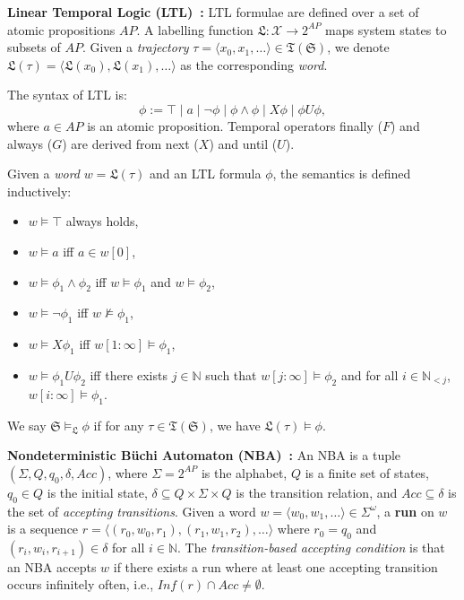 \textbf{Linear Temporal Logic (LTL)~\cite{pnueli1977temporal}:} LTL formulae are defined over a set of atomic propositions $AP$. A labelling function $\mathfrak{L}: \mathcal{X} \rightarrow 2^{AP}$ maps system states to subsets of $AP$. Given a \emph{trajectory} $\tau = \langle x_0, x_1, \dots \rangle \in \mathfrak{T}(\mathfrak{S})$, we denote $\mathfrak{L}(\tau) = \langle \mathfrak{L}(x_0), \mathfrak{L}(x_1), \dots \rangle$ as the corresponding \emph{word}.

The syntax of LTL is:
\[
\phi := \top \mid a \mid \lnot \phi \mid \phi \land \phi \mid X \phi \mid \phi U \phi,
\]
where $a \in AP$ is an atomic proposition. Temporal operators finally ($F$) and always ($G$) are derived from next ($X$) and until ($U$).

Given a \emph{word} $w = \mathfrak{L}(\tau)$ and an LTL formula $\phi$, the semantics is defined inductively:
\begin{itemize}
    \item \(w \models \top \) always holds,
    \item \(w \models a\)  iff  \(a \in w[0]\),
    \item \(w \models \phi_1 \land \phi_2\)  iff  \(w \models \phi_1\) and \(w \models \phi_2\),
    \item \(w \models \lnot \phi_1\)  iff  \(w \not\models \phi_1\),
    \item \(w \models X \phi_1\)  iff  \(w[1:\infty] \models \phi_1\),
    \item \(w \models \phi_1 U \phi_2\)  iff  there exists \(j \in \mathbb{N}\) such that \(w[j:\infty] \models \phi_2\) and for all \(i \in \mathbb{N}_{<j}\), \(w[i:\infty] \models \phi_1\).
\end{itemize}
We say $\mathfrak{S} \models_{\mathfrak{L}} \phi$ if for any $\tau \in \mathfrak{T}(\mathfrak{S})$, we have $\mathfrak{L}(\tau) \models \phi$.

\textbf{Nondeterministic Büchi Automaton (NBA)~\cite{hahn2020reward}:} An NBA is a tuple $(\Sigma, Q, q_0, \delta, Acc)$, where $\Sigma = 2^{AP}$ is the alphabet, $Q$ is a finite set of states, $q_0 \in Q$ is the initial state, $\delta \subseteq Q \times \Sigma \times Q$ is the transition relation, and $Acc \subseteq \delta$ is the set of \emph{accepting transitions}. Given a word $w = \langle w_0, w_1, \ldots \rangle \in \Sigma^{\omega}$, a \textbf{run} on $w$ is a sequence $r = \langle (r_0, w_0, r_1), (r_1, w_1, r_2), \ldots \rangle$ where $r_0 = q_0$ and $(r_i, w_i, r_{i+1}) \in \delta$ for all $i \in \mathbb{N}$. The \textit{transition-based accepting condition} is that an NBA accepts $w$ if there exists a run where at least one accepting transition occurs infinitely often, i.e., $\mathit{Inf}(r) \cap Acc \neq \emptyset$.

